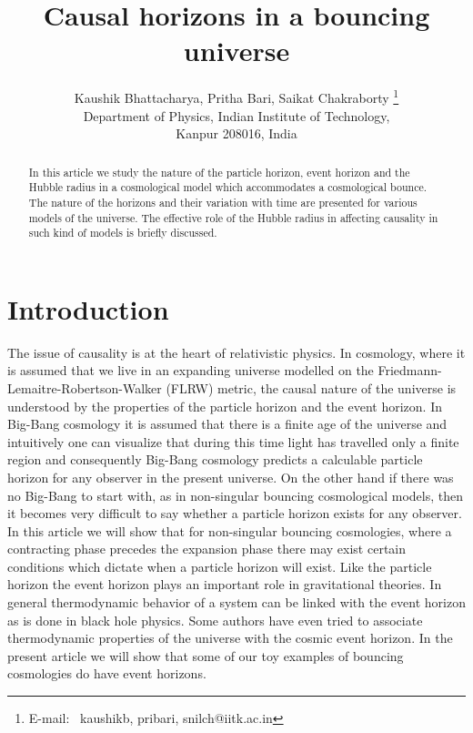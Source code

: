 \documentclass[24pt]{article}
\begin{document}
\title{\bf Causal horizons in a bouncing universe}
\author{Kaushik Bhattacharya, Pritha Bari, Saikat Chakraborty 
\thanks{ E-mail:~ kaushikb, pribari, snilch@iitk.ac.in} 
\\ 
\normalsize
Department of Physics, Indian Institute of Technology,\\ 
\normalsize
Kanpur 208016, India}
\maketitle 
\begin{abstract}
In this article we study the nature of the particle horizon, event
horizon and the Hubble radius in a cosmological model which
accommodates a cosmological bounce. The nature of the horizons and
their variation with time are presented for various models of the
universe. The effective role of the Hubble radius in affecting
causality in such kind of models is briefly discussed.
\end{abstract}
\section{Introduction}

The issue of causality is at the heart of relativistic physics. In
cosmology, where it is assumed that we live in an expanding universe
modelled on the Friedmann-Lemaitre-Robertson-Walker (FLRW) metric, the
causal nature of the universe is understood by the properties 
of the particle horizon and the event horizon.  In Big-Bang cosmology
it is assumed that there is a finite age of the universe and
intuitively one can visualize that during this time light has
travelled only a finite region and consequently Big-Bang cosmology
predicts a calculable particle horizon for any observer in the present
universe. On the other hand if there was no Big-Bang to start with, as
in non-singular bouncing cosmological
models\cite{Brandenberger:2016vhg,Novello:2008ra}, then it becomes
very difficult to say whether a particle horizon exists for any
observer.  In this article we will show that for non-singular bouncing
cosmologies, where a contracting phase precedes the expansion phase
there may exist certain conditions which dictate when a particle
horizon will exist. Like the particle horizon the event horizon plays
an important role in gravitational theories. In general thermodynamic
behavior of a system can be linked with the event horizon as is done
in black hole physics.  Some authors have even tried to associate
thermodynamic properties of the universe with the cosmic event
horizon\cite{Gibbons:1977mu}.  In the present article we will show
that some of our toy examples of bouncing cosmologies do have event
horizons.
\end{document}
